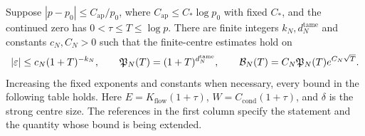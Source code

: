 \begin{lemma}\label{inf:detuning-dependencies}
Suppose $|p-p_0|\le C_{\mathrm{ap}}/p_0$, where
$C_{\mathrm{ap}}\le C_*\log p_0$ with fixed $C_*$, and the continued
zero has $0<\tau\le T\le\log p$. There are finite integers
$k_N,d_N^{\mathrm{tame}}$ and constants $c_N,C_N>0$ such that the
finite-centre estimates hold on
\[
 |\varepsilon|\le c_N(1+T)^{-k_N},\qquad
 \mathfrak P_N(T)=(1+T)^{d_N^{\mathrm{tame}}},\qquad
 \mathcal B_N(T)=C_N\mathfrak P_N(T)e^{C_N\sqrt T}.
\]
Increasing the fixed exponents and constants when necessary, every
bound in the following table holds. Here $E=K_{\mathrm{flow}}(1+\tau)$,
$W=C_{\mathrm{cond}}(1+\tau)$, and $\delta$ is the strong centre size.
The references in the first column specify the statement
and the quantity whose bound is being extended.


\end{lemma}
